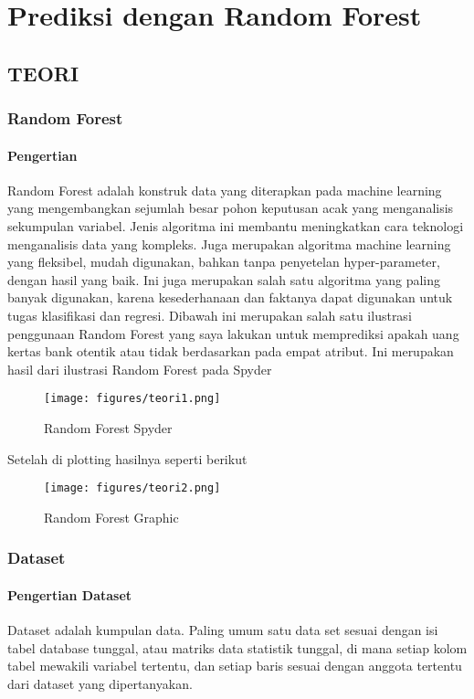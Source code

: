 \chapter{Prediksi dengan Random Forest}
\section{ TEORI}
\subsection{Random Forest }
\subsubsection{Pengertian}
Random Forest adalah konstruk data yang diterapkan pada machine learning yang mengembangkan sejumlah besar pohon keputusan acak yang menganalisis sekumpulan variabel. Jenis algoritma ini membantu meningkatkan cara teknologi menganalisis data yang kompleks. Juga merupakan algoritma machine learning yang fleksibel, mudah digunakan, bahkan tanpa penyetelan hyper-parameter, dengan hasil yang baik. Ini juga merupakan salah satu algoritma yang paling banyak digunakan, karena kesederhanaan dan faktanya dapat digunakan untuk tugas klasifikasi dan regresi.
Dibawah ini merupakan salah satu ilustrasi penggunaan Random Forest yang saya lakukan untuk memprediksi apakah uang kertas bank otentik atau tidak berdasarkan pada empat atribut.
Ini merupakan hasil dari ilustrasi Random Forest pada Spyder
\begin{figure}[ht]
\centering
\texttt{[image: figures/teori1.png]}
\caption{Random Forest Spyder}
\label{Contoh}
\end{figure}
\par
Setelah di plotting hasilnya seperti berikut
\begin{figure}[ht]
\centering
\texttt{[image: figures/teori2.png]}
\caption{Random Forest Graphic}
\label{Contoh}
\end{figure}

\subsection{Dataset}
\subsubsection{Pengertian Dataset}
Dataset adalah kumpulan data. Paling umum satu data set sesuai dengan isi tabel database tunggal, atau matriks data statistik tunggal, di mana setiap kolom tabel mewakili variabel tertentu, dan setiap baris sesuai dengan anggota tertentu dari dataset yang dipertanyakan.
